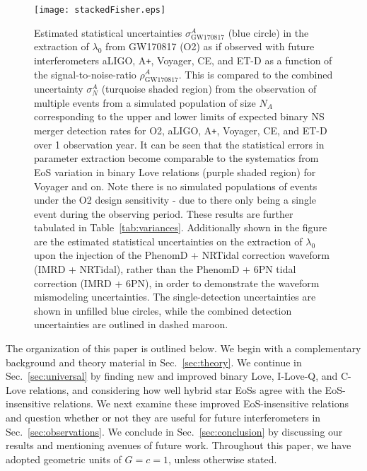 \documentclass[prd,twocolumn,nofootinbib,superscriptaddress,amsmath,amssymb]{revtex4-1}
\begin{document}
\begin{figure}
\begin{center} 
\texttt{[image: stackedFisher.eps]}
\end{center}
\caption{
Estimated statistical uncertainties $\sigma^A_{\text{GW170817}}$ (blue circle) in the extraction of $\lambda_0$ from GW170817 (O2) as if observed with future interferometers aLIGO, A\texttt{+}, Voyager, CE, and ET-D as a function of the signal-to-noise-ratio $\rho^A_{\text{GW170817}}$.
This is compared to the combined uncertainty $\sigma^A_N$ (turquoise shaded region) from the observation of multiple events from a simulated population of size $N_A$ corresponding to the upper and lower limits of expected binary NS merger detection rates for O2, aLIGO, A\texttt{+}, Voyager, CE, and ET-D over 1 observation year.
It can be seen that the statistical errors in parameter extraction become comparable to the systematics from EoS variation in binary Love relations (purple shaded region) for Voyager and on.
Note there is no simulated populations of events under the O2 design sensitivity - due to there only being a single event during the observing period.
These results are further tabulated in Table~\ref{tab:variances}.
Additionally shown in the figure are the estimated statistical uncertainties on the extraction of $\lambda_0$ upon the injection of the PhenomD + NRTidal correction waveform (IMRD + NRTidal), rather than the PhenomD + 6PN tidal correction (IMRD + 6PN), in order to demonstrate the waveform mismodeling uncertainties.
The single-detection uncertainties are shown in unfilled blue circles, while the combined detection uncertainties are outlined in dashed maroon.
}
\label{fig:stackedFisher}
\end{figure} 

The organization of this paper is outlined below.
We begin with a complementary background and theory material in Sec.~\ref{sec:theory}.
We continue in Sec.~\ref{sec:universal} by finding new and improved binary Love, I-Love-Q, and C-Love relations, and considering how well hybrid star EoSs agree with the EoS-insensitive relations.
We next examine these improved EoS-insensitive relations and question whether or not they are useful for future interferometers in Sec.~\ref{sec:observations}.
We conclude in Sec.~\ref{sec:conclusion} by discussing our results and mentioning avenues of future work.
Throughout this paper, we have adopted geometric units of $G=c=1$, unless otherwise stated.

\end{document}
